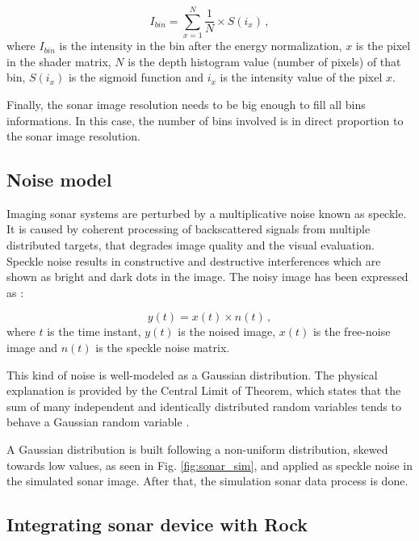 \documentclass[final,5p,times]{elsarticle}
\begin{document}
\begin{equation}
    \label{eq:1}
    I_{bin} = \sum\limits_{x=1}^N \frac{1}{N} \times S(i_{x}) \, ,
\end{equation}
where $I_{bin}$ is the intensity in the bin after the energy normalization, $x$ is the pixel in the shader matrix, $N$ is the depth histogram value (number of pixels) of that bin, $S(i_{x})$ is the sigmoid function and $i_{x}$ is the intensity value of the pixel $x$.

Finally, the sonar image resolution needs to be big enough to fill all bins informations. In this case, the number of bins involved is in direct proportion to the sonar image resolution.


\subsection{Noise model}
\label{dev:noise}

Imaging sonar systems are perturbed by a multiplicative noise known as speckle. It is caused by coherent processing of backscattered signals from multiple distributed targets, that degrades image quality and the visual evaluation. Speckle noise results in constructive and destructive interferences which are shown as bright and dark dots in the image. The noisy image has been expressed as \cite{lee1980}:

\begin{equation}
\label{eq:2}
y(t) = x(t) \times n(t) \, ,
\end{equation}
where $t$ is the time instant, $y(t)$ is the noised image, $x(t)$ is the free-noise image and $n(t)$ is the speckle noise matrix.

This kind of noise is well-modeled as a Gaussian distribution. The physical explanation is provided by the Central Limit of Theorem, which states that the sum of many independent and identically distributed random variables tends to behave a Gaussian random variable \cite{papoulis2002}.

A Gaussian distribution is built following a non-uniform distribution, skewed towards low values, as seen in Fig. \ref{fig:sonar_sim}, and applied as speckle noise in the simulated sonar image. After that, the simulation sonar data process is done.

\subsection{Integrating sonar device with Rock}
\label{dev:rock}
\end{document}
